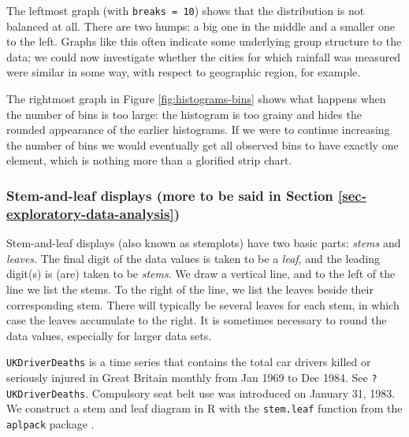 \documentclass[]{book}
\numberwithin{equation}{chapter}
\numberwithin{figure}{chapter}
\theoremstyle{plain}
\theoremstyle{definition}
\theoremstyle{remark}
\theoremstyle{definition}
\theoremstyle{definition}
\theoremstyle{remark}
\let\BeginKnitrBlock\begin \let\EndKnitrBlock\end
\begin{document}
The leftmost graph (with \texttt{breaks\ =\ 10}) shows that the
distribution is not balanced at all. There are two humps: a big one in
the middle and a smaller one to the left. Graphs like this often
indicate some underlying group structure to the data; we could now
investigate whether the cities for which rainfall was measured were
similar in some way, with respect to geographic region, for example.

The rightmost graph in Figure \ref{fig:histograms-bins} shows what
happens when the number of bins is too large: the histogram is too
grainy and hides the rounded appearance of the earlier histograms. If we
were to continue increasing the number of bins we would eventually get
all observed bins to have exactly one element, which is nothing more
than a glorified strip chart.

\subsubsection{Stem-and-leaf displays (more to be said in Section
\ref{sec-exploratory-data-analysis})}\label{stem-and-leaf-displays-more-to-be-said-in-section-refsec-exploratory-data-analysis}

Stem-and-leaf displays (also known as stemplots) have two basic parts:
\emph{stems} and \emph{leaves}. The final digit of the data values is
taken to be a \emph{leaf}, and the leading digit(s) is (are) taken to be
\emph{stems}. We draw a vertical line, and to the left of the line we
list the stems. To the right of the line, we list the leaves beside
their corresponding stem. There will typically be several leaves for
each stem, in which case the leaves accumulate to the right. It is
sometimes necessary to round the data values, especially for larger data
sets.

\bigskip

\BeginKnitrBlock{example}[Driver Deaths in the United Kingdom]
\protect\hypertarget{ex:ukdriverdeaths-first}{}{\label{ex:ukdriverdeaths-first}
\iffalse (Driver Deaths in the United Kingdom)
\fi }\texttt{UKDriverDeaths}  is a time series that
contains the total car drivers killed or seriously injured in Great
Britain monthly from Jan 1969 to Dec 1984. See \texttt{?UKDriverDeaths}.
Compulsory seat belt use was introduced on January 31, 1983. We
construct a stem and leaf diagram in R with the \texttt{stem.leaf}
 function from the \texttt{aplpack}
 package \autocite{aplpack}.
\EndKnitrBlock{example}
\end{document}
